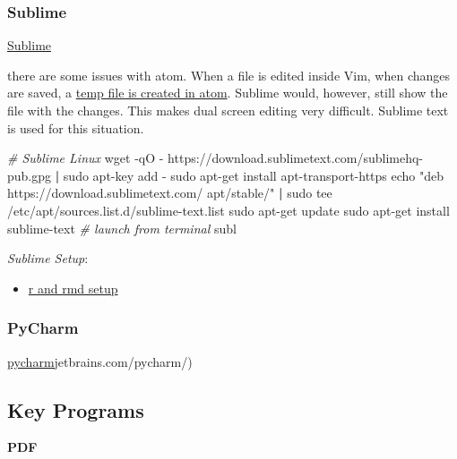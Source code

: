 \documentclass[]{article}
\newenvironment{Shaded}{\begin{snugshade}}{\end{snugshade}}
\newcommand{\BuiltInTok}[1]{#1}
\newcommand{\CommentTok}[1]{\textcolor[rgb]{0.56,0.35,0.01}{\textit{#1}}}
\newcommand{\ExtensionTok}[1]{#1}
\newcommand{\FunctionTok}[1]{\textcolor[rgb]{0.00,0.00,0.00}{#1}}
\newcommand{\KeywordTok}[1]{\textcolor[rgb]{0.13,0.29,0.53}{\textbf{#1}}}
\newcommand{\NormalTok}[1]{#1}
\newcommand{\StringTok}[1]{\textcolor[rgb]{0.31,0.60,0.02}{#1}}
\providecommand{\tightlist}{%
  \setlength{\itemsep}{0pt}\setlength{\parskip}{0pt}}
\begin{document}
\hypertarget{sublime}{%
\subsubsection{Sublime}\label{sublime}}

\href{https://www.sublimetext.com/3}{Sublime}

there are some issues with atom. When a file is edited inside Vim, when
changes are saved, a
\href{https://github.com/atom/atom/issues/17186}{temp file is created in
atom}. Sublime would, however, still show the file with the changes.
This makes dual screen editing very difficult. Sublime text is used for
this situation.

\begin{Shaded}
\begin{Highlighting}[]
\CommentTok{# Sublime Linux}
\FunctionTok{wget}\NormalTok{ -qO - https://download.sublimetext.com/sublimehq-pub.gpg }\KeywordTok{|} \FunctionTok{sudo}\NormalTok{ apt-key add -}
\FunctionTok{sudo}\NormalTok{ apt-get install apt-transport-https}
\BuiltInTok{echo} \StringTok{"deb https://download.sublimetext.com/ apt/stable/"} \KeywordTok{|} \FunctionTok{sudo}\NormalTok{ tee /etc/apt/sources.list.d/sublime-text.list}
\FunctionTok{sudo}\NormalTok{ apt-get update}
\FunctionTok{sudo}\NormalTok{ apt-get install sublime-text}
\CommentTok{# launch from terminal}
\ExtensionTok{subl}
\end{Highlighting}
\end{Shaded}

\emph{Sublime Setup}:

\begin{itemize}
\tightlist
\item
  \href{https://weibeld.net/r/rmd_sublime_package.html}{r and rmd setup}
\end{itemize}

\hypertarget{pycharm}{%
\subsubsection{PyCharm}\label{pycharm}}

\href{https://www.}{pycharm}jetbrains.com/pycharm/)

\hypertarget{key-programs}{%
\subsection{Key Programs}\label{key-programs}}

\textbf{PDF}
\end{document}
